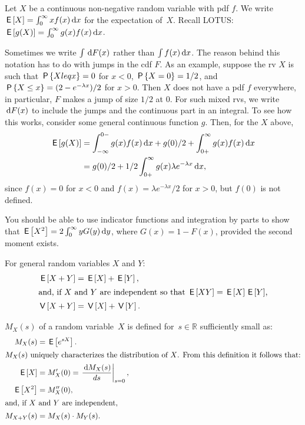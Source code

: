 \documentclass[queueing-book]{subfiles}
\begin{document}
Let $X$ be a continuous non-negative random variable with pdf $f$.
We write $ \E{X} = \int_0^\infty x f(x) \d x$ for the expectation of~$X$.
Recall LOTUS: $\E{g(X)} = \int_0^\infty g(x) f(x) \d x$.

Sometimes we write $\int \d F(x)$ rather than $\int f(x) \d x$. The reason behind this notation has to do with jumps in the cdf $F$. As an example, suppose the rv $X$ is such that $\P{Xleq x} = 0$ for $x<0$, $\P{X=0} = 1/2$, and $\P{X\leq x} = (2-e^{-\lambda x})/2$ for $x>0$. Then $X$ does not have a pdf $f$ everywhere, in particular, $F$ makes a jump of size $1/2$ at $0$. For such mixed rvs, we write $\d F(x)$ to include the jumps and the continuous part in an integral. To see how this works, consider some general continuous function $g$. Then, for the $X$ above,
\begin{align*}
\E{g(X)} &= \int_{-\infty}^{0-} g(x) f(x) \d x + g(0)/2 + \int_{0+}^{\infty} g(x) f(x) \d x \\
 &= g(0)/2 + 1/2 \int_{0+}^{\infty} g(x) \lambda e^{-\lambda x} \d x,
\end{align*}
since $f(x) = 0$ for $x<0$ and $f(x) = \lambda e^{-\lambda x}/2$ for $x>0$, but  $f(0)$ is not defined.


You should be able to use indicator functions and integration by parts to show that $\E{X^2} = 2\int_0^\infty y G(y) \d y$, where $G(x) = 1- F(x)$, provided the second moment exists.

For general random variables $X$ and $Y$:
\begin{align}
  \E{X+Y} &= \E X + \E Y, \label{eq:95}\\
\intertext{and, if $X$ and $Y$ are independent so that $\E{XY} = \E X \E Y$,}
  \V{X+Y} &= \V X + \V Y. \label{eq:94}
\end{align}

 $M_X(s)$ of a random variable~$X$ is defined for~$s\in \mathbb{R}$ sufficiently small as:
\begin{subequations}
\begin{align}
 M_X(s) &= \E{e^{s X}}. \label{eq:75}\\
\intertext{$M_X(s)$  uniquely characterizes the distribution of $X$. From this definition it follows that:}
 \E{X} &= M_{X}'(0) = \left.\frac{\d M_{X}(s)}{d s}\right|_{s=0},\label{eq:69}\\
\E{X^2} &= M_{X}''(0), \label{eq:64}\\
\intertext{and, if $X$ and $Y$ are independent,}
M_{X+Y}(s) &= M_X(s)\cdot M_Y(s). \label{eq:73}
\end{align}
\end{subequations}
\end{document}
